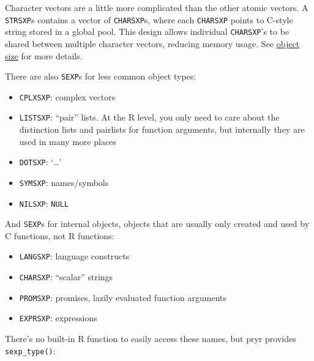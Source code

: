 Character vectors are a little more complicated than the other atomic
vectors. A \texttt{STRSXP}s contains a vector of \texttt{CHARSXP}s,
where each \texttt{CHARSXP} points to C-style string stored in a global
pool. This design allows individual \texttt{CHARSXP}'s to be shared
between multiple character vectors, reducing memory usage. See
\hyperref[object-size]{object size} for more details.

There are also \texttt{SEXP}s for less common object types:

\begin{itemize}
\itemsep1pt\parskip0pt
\item
  \texttt{CPLXSXP}: complex vectors
\item
  \texttt{LISTSXP}: ``pair'' lists. At the R level, you only need to
  care about the distinction lists and pairlists for function arguments,
  but internally they are used in many more places
\item
  \texttt{DOTSXP}: `\ldots{}'
\item
  \texttt{SYMSXP}: names/symbols
\item
  \texttt{NILSXP}: \texttt{NULL}
\end{itemize}

And \texttt{SEXP}s for internal objects, objects that are usually only
created and used by C functions, not R functions:

\begin{itemize}
\itemsep1pt\parskip0pt
\item
  \texttt{LANGSXP}: language constructs
\item
  \texttt{CHARSXP}: ``scalar'' strings
\item
  \texttt{PROMSXP}: promises, lazily evaluated function arguments
\item
  \texttt{EXPRSXP}: expressions
\end{itemize}

There's no built-in R function to easily access these names, but pryr
provides \texttt{sexp\_type()}:

\begin{Shaded}
\begin{Highlighting}[]

\NormalTok{(}\NormalTok{)}
\NormalTok{(}\NormalTok{(} \NormalTok{))}
\NormalTok{(}\NormalTok{(} \NormalTok{))}
\end{Highlighting}
\end{Shaded}

